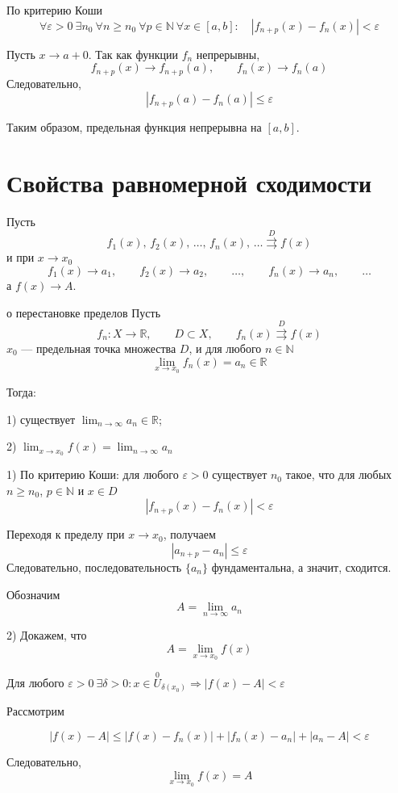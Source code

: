 \documentclass[12pt,a4paper]{article}
\begin{document}
\begin{proofbox}{}

    По критерию Коши
    \[
        \forall\varepsilon>0\ \exists n_0\
        \forall n\geq n_0\
        \forall p\in\mathbb{N}\
        \forall x\in[a,b]:
        \quad
        |f_{n+p}(x)-f_n(x)|<\varepsilon
    \]

    Пусть $x\to a+0$. Так как функции $f_n$ непрерывны,
    \[
        f_{n+p}(x)\to f_{n+p}(a),
        \qquad
        f_n(x)\to f_n(a)
    \]
    Следовательно,
    \[
        |f_{n+p}(a)-f_n(a)|\leq\varepsilon
    \]

    Таким образом, предельная функция непрерывна на $[a,b]$.

\end{proofbox}

\newpage

\section{Свойства равномерной сходимости}

Пусть
\[
    f_1(x),\, f_2(x),\,\ldots,\,f_n(x),\,\ldots
    \overset{D}{\rightrightarrows} f(x)
\]
и при $x\to x_0$
\[
    f_1(x)\to a_1,\qquad
    f_2(x)\to a_2,\qquad
    \ldots,\qquad
    f_n(x)\to a_n,\qquad
    \ldots
\]
а $f(x)\to A$.

\begin{theorem}{о перестановке пределов}
    Пусть
    \[
        f_n:X\to\mathbb{R},\qquad D\subset X,\qquad
        f_n(x)\overset{D}{\rightrightarrows}f(x)
    \]
    $x_0$ --- предельная точка множества $D$, и для любого $n\in\mathbb{N}$
    \[
        \lim_{x\to x_0}f_n(x)=a_n\in\mathbb{R}
    \]

    Тогда:

    1) существует $\displaystyle\lim_{n\to\infty}a_n\in\mathbb{R}$;

    2) $\lim_{x\to x_0}f(x) = \lim_{n\to\infty}a_n$
\end{theorem}

\begin{proofbox}{}
    1) По критерию Коши: для любого $\varepsilon>0$ существует $n_0$ такое, что для любых $n\geq n_0$, $p\in\mathbb{N}$ и $x\in D$
    \[
        |f_{n+p}(x)-f_n(x)|<\varepsilon
    \]

    Переходя к пределу при $x\to x_0$, получаем
    \[
        |a_{n+p}-a_n|\leq\varepsilon
    \]
    Следовательно, последовательность $\{a_n\}$ фундаментальна, а значит, сходится.

    Обозначим
    \[
        A=\lim_{n\to\infty}a_n
    \]

    2) Докажем, что
    \[
        A=\lim_{x\to x_0}f(x)
    \]

    Для любого $\varepsilon>0 \ \exists \delta > 0: x \in \overset{0}{U}_{\delta(x_0)} \Longrightarrow |f(x) - A| < \varepsilon$

    Рассмотрим

    \[
        |f(x) - A| \leq |f(x) - f_n(x)| + |f_n(x) - a_n| + |a_n - A|<\varepsilon
    \]

    Следовательно,
    \[
        \lim_{x\to x_0}f(x)=A
    \]
\end{proofbox}
\end{document}
